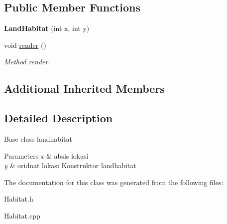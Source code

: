 \subsection*{Public Member Functions}
\begin{DoxyCompactItemize}
\item 
{\bfseries Land\+Habitat} (int x, int y)\hypertarget{classLandHabitat_a2ca94610d493f3bd8b54b3b53a231536}{}\label{classLandHabitat_a2ca94610d493f3bd8b54b3b53a231536}

\item 
void \hyperlink{classLandHabitat_ad90a2fd22fa5b521d5e19e61798e3175}{render} ()\hypertarget{classLandHabitat_ad90a2fd22fa5b521d5e19e61798e3175}{}\label{classLandHabitat_ad90a2fd22fa5b521d5e19e61798e3175}

\begin{DoxyCompactList}\small\item\em Method render. \end{DoxyCompactList}\end{DoxyCompactItemize}
\subsection*{Additional Inherited Members}


\subsection{Detailed Description}
Base class landhabitat


\begin{DoxyParams}{Parameters}
{\em x} & absis lokasi \\
\hline
{\em y} & oridnat lokasi Konstruktor landhabitat \\
\hline
\end{DoxyParams}


The documentation for this class was generated from the following files\+:\begin{DoxyCompactItemize}
\item 
Habitat.\+h\item 
Habitat.\+cpp\end{DoxyCompactItemize}
